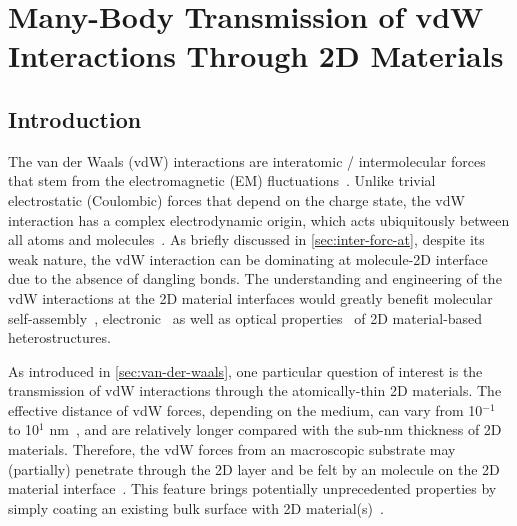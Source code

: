 \chapter{Many-Body Transmission of vdW Interactions Through 2D Materials}
\label{ch:vdw}
\renewcommand*\imgdir{img/vdw/}


\vspace{1em}


\section{Introduction}
\label{sec:vdw-introduction}
The van der Waals (vdW) interactions are inter\-atomic /
inter\-molecular forces that stem from the electromagnetic (EM)
fluctuations~\cite{Israelachvili_2011_book,Woods_2016_rev_vdw,parsegian_van_2010_book}.
%
Unlike trivial electrostatic (Coulombic) forces that depend on the
charge state, the vdW interaction has a complex electro\-dynamic
origin, which acts ubiquitously between all atoms and molecules~\cite{Israelachvili_2011_book,Hermann_2017_vdW_rev}.
%
As briefly discussed in \autoref{sec:inter-forc-at}, despite its weak nature, the vdW interaction can be dominating at
molecule-2D interface due to the absence of dangling bonds.
%
The understanding and engineering of the vdW interactions at the 2D
material interfaces would greatly benefit molecular
self-assembly~\cite{Kumar_2017_rev_assemb_2D},
electronic~\cite{Wang_2015_phys_chem_tuning_TMDC,Lazar_2013} as well
as optical properties~\cite{Geim_2013_2D_vdw_Het,Novoselov_2016_vdW}
of 2D material-based hetero\-structures.
%

As introduced in \autoref{sec:van-der-waals}, one particular question
of interest is the transmission of vdW interactions through the
atomically-thin 2D materials.
%
The effective distance of vdW forces, depending on the medium, can
vary from 10$^{-1}$ to 10$^{1}$ nm~\cite{Israelachvili_2011_book}, and are
relatively longer compared with the sub-nm thickness of 2D materials.
%
Therefore, the vdW forces from an macroscopic substrate may
(partially) penetrate through the 2D layer and be felt by an molecule
on the 2D material interface~\cite{shih_2013_wetting_natmat}.
%
This feature
brings potentially unprecedented properties by simply coating
an existing bulk surface with 2D
material(s)~\cite{Prasai_2012_coating,rafiee_2012_transparency,Tsoi_2014_vdW_screening_2D}.
%


